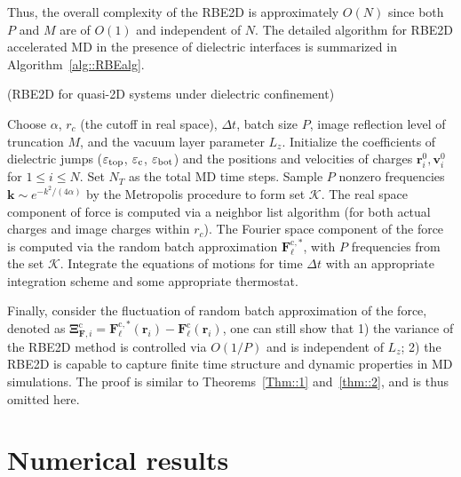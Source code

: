 Thus, the overall complexity of the RBE2D is approximately $O(N)$ since both $P$ and $M$ are of $O(1)$ and independent   {of} $N$.
The detailed algorithm for RBE2D accelerated MD in the presence of dielectric interfaces is summarized in Algorithm~\ref{alg::RBEalg}.

\begin{algorithm}[H]
 \caption{(RBE2D for quasi-2D systems under dielectric confinement)}\label{alg::RBEalg}
 \begin{algorithmic}[1]
  \State Choose $\alpha$, $r_c$ (the cutoff in real space), $\Delta t$, batch size $P$, image reflection level of truncation $M$, and the vacuum layer parameter $L_z$. Initialize the coefficients of dielectric jumps ($\varepsilon_{\rm{top}}$, $\varepsilon_{\rm{c}}$, $\varepsilon_{\rm{bot}}$) and the positions and velocities of charges $\bm{r}^0_i, \bm{v}^0_i$ for $1\le i\le N$. Set $N_T$ as the total MD time steps.
  \State Sample $P$ nonzero frequencies $\bm{k}\sim e^{-k^2/(4\alpha)}$ by the Metropolis procedure to form set $\mathcal{K}$.
  \State The real space component of force is computed via a neighbor list algorithm (for both actual charges and image charges within $r_c$).
  \State The Fourier space component of  {the} force is computed via the random batch approximation $\bm{F}_{\ell}^{\text{c},*}$, with $P$ frequencies from the set $\mathcal{K}$.
  \State Integrate the equations of motions for time $\Delta t$ with  {an} appropriate integration scheme and some appropriate thermostat. 
  \EndFor
 \end{algorithmic}
\end{algorithm}

Finally, consider the fluctuation of random batch approximation of the force, denoted as $\bm{\Xi}_{\bm{F},i}^{\text{c}}=\bm{F}_{\ell}^{\text{c},*}(\bm{r}_i)-\bm{F}_{\ell}^{\text{c}}(\bm{r}_i)$, one can still show that 1) the variance of the RBE2D method is controlled via $O(1/P)$ and is independent of $L_z$; 2) the RBE2D is capable to capture finite time structure and dynamic properties in MD simulations. 
The proof is similar to Theorems~\ref{Thm::1} and~\ref{thm::2}, and is thus omitted here.

\section{Numerical results}\label{sec::numerical}

